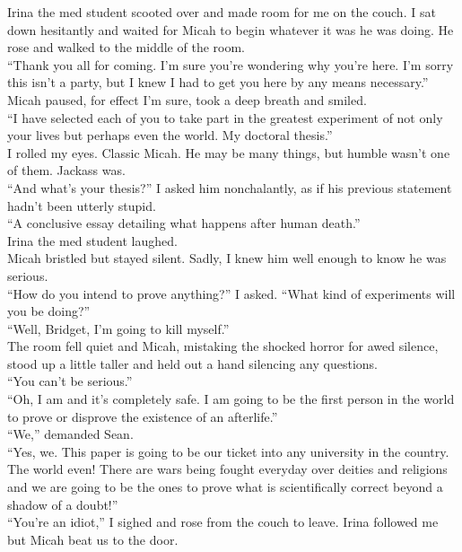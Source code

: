\documentclass[a5paper]{scrartcl}
\begin{document}
Irina the med student scooted over and made room for me on the couch. I sat down hesitantly and waited for Micah to begin whatever it was he was doing. He rose and walked to the middle of the room.\\
\enquote{Thank you all for coming. I’m sure you’re wondering why you’re here. I’m sorry this isn’t a party, but I knew I had to get you here by any means necessary.}\\
Micah paused, for effect I’m sure, took a deep breath and smiled.\\
\enquote{I have selected each of you to take part in the greatest experiment of not only your lives but perhaps even the world. My doctoral thesis.}\\
I rolled my eyes. Classic Micah. He may be many things, but humble wasn’t one of them. Jackass was.\\
\enquote{And what's your thesis?} I asked him nonchalantly, as if his previous statement hadn’t been utterly stupid.\\
\enquote{A conclusive essay detailing what happens after human death.}\\
Irina the med student laughed.\\
Micah bristled but stayed silent. Sadly, I knew him well enough to know he was serious.\\
\enquote{How do you intend to prove anything?} I asked. \enquote{What kind of experiments will you be doing?}\\
\enquote{Well, Bridget, I’m going to kill myself.}\\
The room fell quiet and Micah, mistaking the shocked horror for awed silence, stood up a little taller and held out a hand silencing any questions.\\
\enquote{You can't be serious.}\\
\enquote{Oh, I am and it's completely safe. I am going to be the first person in the world to prove or disprove the existence of an afterlife.}\\
\enquote{We,} demanded Sean.\\
\enquote{Yes, we. This paper is going to be our ticket into any university in the country. The world even! There are wars being fought everyday over deities and religions and we are going to be the ones to prove what is scientifically correct beyond a shadow of a doubt!}\\
\enquote{You're an idiot,} I sighed and rose from the couch to leave. Irina followed me but Micah beat us to the door.\\
\end{document}
